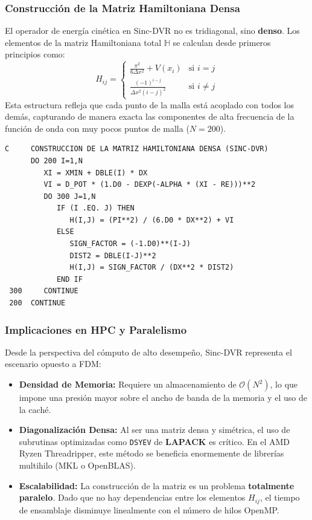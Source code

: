 \documentclass[11pt,fleqn]{article}
\begin{document}
\subsubsection{Construcción de la Matriz Hamiltoniana Densa}

El operador de energía cinética en Sinc-DVR no es tridiagonal, sino \textbf{denso}. Los elementos de la matriz Hamiltoniana total $\mathbb{H}$ se calculan desde primeros principios como:
\begin{equation}
    H_{ij} = 
    \begin{cases} 
    \frac{\pi^2}{6\Delta x^2} + V(x_i) & \text{si } i = j \\
    \frac{(-1)^{i-j}}{\Delta x^2 (i-j)^2} & \text{si } i \neq j 
    \end{cases}
\end{equation}
Esta estructura refleja que cada punto de la malla está acoplado con todos los demás, capturando de manera exacta las componentes de alta frecuencia de la función de onda con muy pocos puntos de malla ($N=200$).

\begin{lstlisting}[caption=Ensamblaje de la matriz densa Sinc-DVR en Fortran 77]
C     CONSTRUCCION DE LA MATRIZ HAMILTONIANA DENSA (SINC-DVR)
      DO 200 I=1,N
         XI = XMIN + DBLE(I) * DX
         VI = D_POT * (1.D0 - DEXP(-ALPHA * (XI - RE)))**2
         DO 300 J=1,N
            IF (I .EQ. J) THEN
               H(I,J) = (PI**2) / (6.D0 * DX**2) + VI
            ELSE
               SIGN_FACTOR = (-1.D0)**(I-J)
               DIST2 = DBLE(I-J)**2
               H(I,J) = SIGN_FACTOR / (DX**2 * DIST2)
            END IF
 300     CONTINUE
 200  CONTINUE
\end{lstlisting}

\subsubsection{Implicaciones en HPC y Paralelismo}

Desde la perspectiva del cómputo de alto desempeño, Sinc-DVR representa el escenario opuesto a FDM:
\begin{itemize}
    \item \textbf{Densidad de Memoria:} Requiere un almacenamiento de $\mathcal{O}(N^2)$, lo que impone una presión mayor sobre el ancho de banda de la memoria y el uso de la caché.
    \item \textbf{Diagonalización Densa:} Al ser una matriz densa y simétrica, el uso de subrutinas optimizadas como \texttt{DSYEV} de \textbf{LAPACK} es crítico. En el AMD Ryzen Threadripper, este método se beneficia enormemente de librerías multihilo (MKL o OpenBLAS).
    \item \textbf{Escalabilidad:} La construcción de la matriz es un problema \textbf{totalmente paralelo}. Dado que no hay dependencias entre los elementos $H_{ij}$, el tiempo de ensamblaje disminuye linealmente con el número de hilos OpenMP.
\end{itemize}
\end{document}
